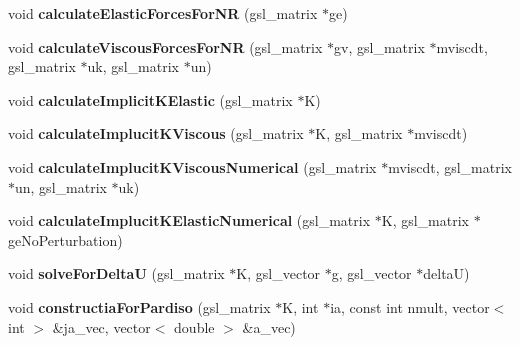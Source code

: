 \begin{DoxyCompactItemize}
\item 
\hypertarget{classSimulation_a651bdb7e32e4c9a2db5a84892bba54e8}{}void {\bfseries calculate\+Elastic\+Forces\+For\+N\+R} (gsl\+\_\+matrix $\ast$ge)\label{classSimulation_a651bdb7e32e4c9a2db5a84892bba54e8}

\item 
\hypertarget{classSimulation_a62852dd6f60ee76f3d7ec3c25dfa4a43}{}void {\bfseries calculate\+Viscous\+Forces\+For\+N\+R} (gsl\+\_\+matrix $\ast$gv, gsl\+\_\+matrix $\ast$mviscdt, gsl\+\_\+matrix $\ast$uk, gsl\+\_\+matrix $\ast$un)\label{classSimulation_a62852dd6f60ee76f3d7ec3c25dfa4a43}

\item 
\hypertarget{classSimulation_a37f5c42e6189094eeb354f1290ae9b18}{}void {\bfseries calculate\+Implicit\+K\+Elastic} (gsl\+\_\+matrix $\ast$K)\label{classSimulation_a37f5c42e6189094eeb354f1290ae9b18}

\item 
\hypertarget{classSimulation_a72f041b29cffd4b018afd3a8fea9f758}{}void {\bfseries calculate\+Implucit\+K\+Viscous} (gsl\+\_\+matrix $\ast$K, gsl\+\_\+matrix $\ast$mviscdt)\label{classSimulation_a72f041b29cffd4b018afd3a8fea9f758}

\item 
\hypertarget{classSimulation_a6619bac88b13310f52a396a316577787}{}void {\bfseries calculate\+Implucit\+K\+Viscous\+Numerical} (gsl\+\_\+matrix $\ast$mviscdt, gsl\+\_\+matrix $\ast$un, gsl\+\_\+matrix $\ast$uk)\label{classSimulation_a6619bac88b13310f52a396a316577787}

\item 
\hypertarget{classSimulation_afea9ef41c9ecb5e5891b7787fb76bdf1}{}void {\bfseries calculate\+Implucit\+K\+Elastic\+Numerical} (gsl\+\_\+matrix $\ast$K, gsl\+\_\+matrix $\ast$ge\+No\+Perturbation)\label{classSimulation_afea9ef41c9ecb5e5891b7787fb76bdf1}

\item 
\hypertarget{classSimulation_a23927524ed4ee666bb3f7845b8e5c34f}{}void {\bfseries solve\+For\+Delta\+U} (gsl\+\_\+matrix $\ast$K, gsl\+\_\+vector $\ast$g, gsl\+\_\+vector $\ast$delta\+U)\label{classSimulation_a23927524ed4ee666bb3f7845b8e5c34f}

\item 
\hypertarget{classSimulation_aac47a578fcfe5935eca3fbb9580dc5b0}{}void {\bfseries constructia\+For\+Pardiso} (gsl\+\_\+matrix $\ast$K, int $\ast$ia, const int nmult, vector$<$ int $>$ \&ja\+\_\+vec, vector$<$ double $>$ \&a\+\_\+vec)\label{classSimulation_aac47a578fcfe5935eca3fbb9580dc5b0}


\end{DoxyCompactItemize}
